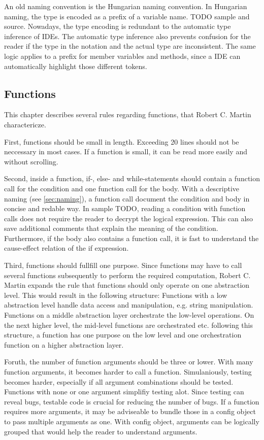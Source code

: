 An old naming convention is the Hungarian naming convention. In Hungarian naming, the type is encoded as a prefix of a variable name. TODO sample and source. Nowadays, the type encoding is redundant to the automatic type inference of IDEs. The automatic type inference also prevents confusion for the reader if the type in the notation and the actual type are inconsistent. The same logic applies to a prefix for member variables and methods, since a IDE can automatically highlight those different tokens.

\subsection{Functions}\label{sec:functions}
This chapter describes several rules regarding functions, that Robert C. Martin charactericze\cite{martin_clean_2009}. 

First, functions should be small in length. Exceeding 20 lines should not be neccessary in most cases. If a function is small, it can be read more easily and without scrolling. 

Second, inside a function, if-, else- and while-statements should contain a function call for the condition and one function call for the body. With a descriptive naming (see \ref{sec:naming}), a function call document the condition and body in concise and redable way. In sample TODO, reading a condition with function calls does not require the reader to decrypt the logical expression. This can also save additional comments that explain the meaning of the condition. Furthermore, if the body also contains a function call, it is fast to understand the cause-effect relation of the if expression. 

Third, functions should fullfill one purpose. Since functions may have to call several functions subsequently to perform the required computation, Robert C. Martin expands the rule that functions should only operate on one abstraction level. This would result in the following structure:
Functions with a low abstraction level handle data access and manipulation, e.g. string manipulation. Functions on a middle abstraction layer orchestrate the low-level operations. On the next higher level, the mid-level functions are orchestrated etc. following this structure, a function has one purpose on the low level and one orchestration function on a higher abstraction layer. 

Foruth, the number of function arguments should be three or lower. With many function arguments, it becomes harder to call a function. Simulaniously, testing becomes harder, especially if all argument combinations should be tested. Functions with none or one argument simplifiy testing alot. Since testing can reveal bugs, testable code is crucial for reducing the number of bugs.
If a function requires more arguments, it may be adviseable to bundle those in a config object to pass multiple arguments as one. With config object, arguments can be logically grouped that would help the reader to understand arguments. 


